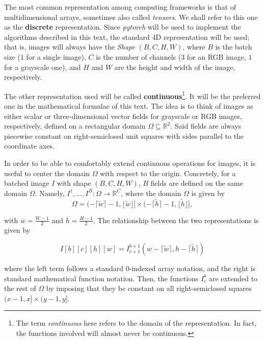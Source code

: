 \documentclass[twocolumn,twoside,a4paper,10pt]{IEEEtran}
\begin{document}
The most common representation among computing frameworks is that of multidimensional arrays, sometimes also called \textit{tensors}. We shall refer to this one as the \textbf{discrete} representation. Since \textit{pytorch} will be used to implement the algorithms described in this text, the standard 4D representation will be used; that is, images will always have the \textit{Shape} \((B, C, H, W)\), where \(B\) is the batch size (\(1\) for a single image), \(C\) is the number of channels (\(3\) for an RGB image, \(1\) for a grayscale one), and \(H\) and \(W\) are the height and width of the image, respectively.

The other representation used will be called \textbf{continuous}\footnote{The term \textit{continuous} here refers to the domain of the representation. In fact, the functions involved will almost never be continuous.}. It will be the preferred one in the mathematical formulae of this text. The idea is to think of images as either scalar or three-dimensional vector fields for grayscale or RGB images, respectively, defined on a rectangular domain \(\Omega\subseteq \mathbb{R}^2\). Said fields are always piecewise constant on right-semiclosed unit squares with sides parallel to the coordinate axes.

In order to be able to comfortably extend continuous operations for images, it is useful to center the domain \(\Omega\) with respect to the origin. Concretely, for a batched image \(I\) with shape \((B, C, H, W)\), \(B\)  fields are defined on the same domain \(\Omega\). Namely, \(I^1, \dots, I^B\colon\Omega\to \mathbb{R}^C\), where the domain \(\Omega\) is given by
\[
  \Omega = (-\lceil \tilde{w}\rceil - 1, \lfloor \tilde{w}\rfloor]\times(-\lceil \tilde{h}\rceil -1, \lfloor \tilde{h}\rfloor]
,\]

with \(\overline{w}=\frac{W-1}{2}\) and \(\overline{h}=\frac{H-1}{2}\). The relationship between the two representations is given by

\begin{equation}\label{eq:discrete-continuous}
  I[b][c][h][w] = I^{b+1}_{c+1}(w - \lceil\tilde{w}\rceil, h - \lceil\tilde{h}\rceil)
\end{equation}

where the left term follows a standard \(0\)-indexed array notation, and the right is standard mathematical function notation. Then, the functions \(I^b_c\) are extended to the rest of \(\Omega\) by imposing that they be constant on all right-semiclosed squares \((x-1,x]\times(y-1, y]\).
\end{document}
